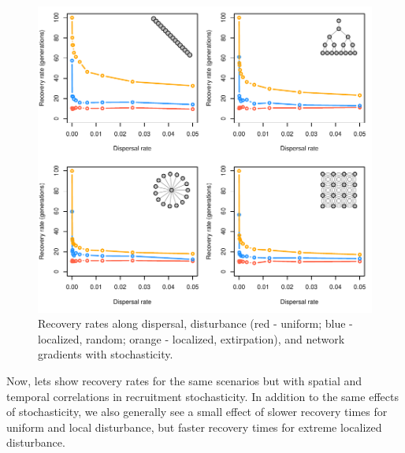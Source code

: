 \documentclass[]{article}
\begin{document}
\begin{figure}[H]

{\centering \includegraphics{Managing_for_ecological_surprises_in_metapopulations_files/figure-latex/stochastic recruitment-1} 

}

\caption{Recovery rates along dispersal, disturbance (red - uniform; blue - localized, random; orange - localized, extirpation), and network gradients with stochasticity.}\label{fig:stochastic recruitment}
\end{figure}
\newpage

Now, lets show recovery rates for the same scenarios but with spatial
and temporal correlations in recruitment stochasticity. In addition to
the same effects of stochasticity, we also generally see a small effect
of slower recovery times for uniform and local disturbance, but faster
recovery times for extreme localized disturbance.
\end{document}
